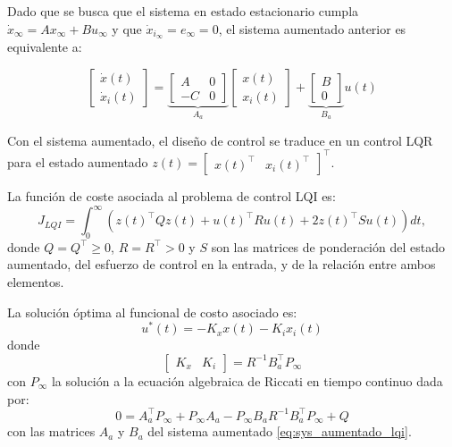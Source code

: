 Dado que se busca que el sistema en estado estacionario cumpla $\dot{x}_\infty = A x_\infty + B u_\infty$ y que $\dot{x}_{i_\infty} = e_\infty  = 0$, el sistema aumentado anterior es equivalente a:

\begin{equation} \label{eq:sys_aumentado_lqi}
    \begin{bmatrix}
        \dot{x}(t) \\ \dot{x}_i(t)
    \end{bmatrix} = \underbrace{\begin{bmatrix}
        A & 0 \\ -C & 0 
    \end{bmatrix}}_{A_a} \begin{bmatrix}
        x(t) \\ x_i(t)
    \end{bmatrix} + \underbrace{\begin{bmatrix}
        B \\ 0
    \end{bmatrix}}_{B_a} u(t)
\end{equation}

Con el sistema aumentado, el diseño de control se traduce en un control LQR para el estado aumentado $z(t)=\begin{bmatrix} x(t)^{\top} & x_i(t)^{\top} \end{bmatrix}^{\top}$.

La función de coste asociada al problema de control LQI es:
\begin{equation} \label{eq:lqi_funcioncoste}
    J_{LQI} = \int_0^\infty \left( z(t)^{\top} Q z(t) + u(t)^{\top} R u(t) + 2 z(t)^{\top} S u(t)\right) dt,
\end{equation}
donde $Q=Q^{\top}\geq0$, $R=R^{\top}>0$ y $S$ son las matrices de ponderación del estado aumentado, del esfuerzo de control en la entrada, y de la relación entre ambos elementos.

La solución óptima al funcional de costo asociado es:
\begin{equation}
    u^*(t) = -K_x x(t) - K_i x_i(t)
\end{equation}
donde 
\begin{equation}
    \begin{bmatrix}
        K_x & K_i 
    \end{bmatrix} = R^{-1} B_a^{\top} P_\infty
\end{equation}
con $P_\infty$ la solución a la ecuación algebraica de Riccati en tiempo continuo dada por:
\begin{equation}
    0 = A_a^{\top} P_\infty + P_\infty A_a - P_\infty B_a R^{-1} B_a^{\top} P_\infty + Q
\end{equation}
con las matrices $A_a$ y $B_a$ del sistema aumentado \eqref{eq:sys_aumentado_lqi}.

